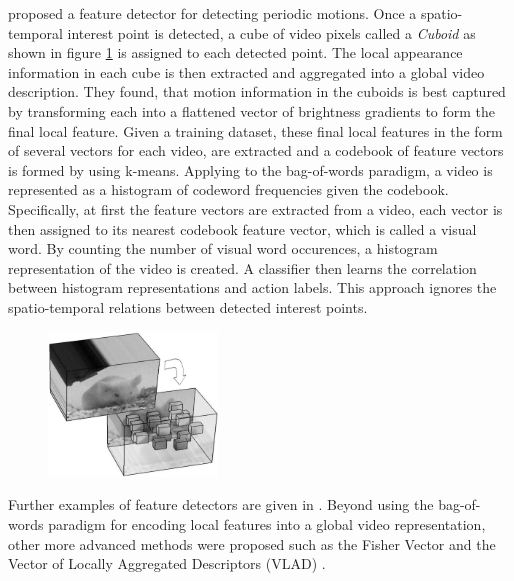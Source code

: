 \textcite{dollar_behavior_2005} proposed a feature detector for detecting periodic motions.
Once a spatio-temporal interest point is detected, a cube of video pixels called a \textit{Cuboid} as shown in figure \ref{fig:dollar_cuboids} is assigned to each detected point.
The local appearance information in each cube is then extracted and aggregated into a global video description.
They found, that motion information in the cuboids is best captured by transforming each into a flattened vector of brightness gradients to form the final local feature.
Given a training dataset, these final local features in the form of several vectors for each video, are extracted and a codebook of feature vectors is formed by using k-means.
Applying to the bag-of-words paradigm, a video is represented as a histogram of codeword frequencies given the codebook.
Specifically, at first the feature vectors are extracted from a video, each vector is then assigned to its nearest codebook feature vector, which is called a visual word.
By counting the number of visual word occurences, a histogram representation of the video is created.
A classifier then learns the correlation between histogram representations and action labels.
This approach ignores the spatio-temporal relations between detected interest points.

\begin{figure}[H]
    \centering
    \includegraphics[width=0.4\textwidth]{img_conventional/dollar_cuboids}
    \caption{\cite{dollar_behavior_2005}}
    \label{fig:dollar_cuboids}
\end{figure}

Further examples of feature detectors are given in \cite{poppe_survey_2010}.
Beyond using the bag-of-words paradigm for encoding local features into a global video representation, other more advanced methods were proposed such as the Fisher Vector\cite{perronnin_fisher_2007} and the Vector of Locally Aggregated Descriptors (VLAD) \cite{jegou_aggregating_2010}.

